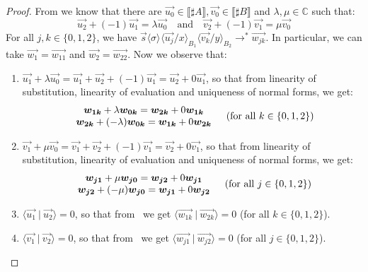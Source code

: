 \documentclass[runningheads,orivec,envcountsame,envcountsect]{llncs}
\newcommand\lra{\longrightarrow}
\newcommand\ansubst[2]{\ensuremath{\langle #1 \rangle_{#2}}}
\def\C{\mathbb{C}}            %
\def\scal#1#2{\langle{#1}~|~{#2}\rangle}
\def\eval{\lra^*}
\def\sem#1{\llbracket#1\rrbracket}
\begin{document}
\begin{proof}
    From  we know that there are $\vec{u_0}\in\sem{\sharp A}, \vec{v_0}\in\sem{\sharp B}$ and $\lambda,\mu\in\C$ such that:
    \[
    \vec{u_2} + (-1) \vec{u_1} = \lambda\vec{u_0}\quad\text{and}\quad\vec{v_2} + (-1) \vec{v_1} = \mu \vec{v_0}
    \]
    For all $j,k\in\{0,1,2\}$, we have $\vec{s}\ansubst{\sigma}{}\ansubst{\vec{u_j}/x}{B_1}\ansubst{\vec{v_k}/y}{B_2}\eval\vec{w_{jk}}$. In particular, we can take $\vec{w_1}=\vec{w_{11}}$ and $\vec{w_2}=\vec{w_{22}}$. Now we observe that:
    \begin{enumerate}
        \item\label{A8:it1} $\vec{u_1}+\lambda\vec{u_0}= \vec{u_1} + \vec{u_2} + (-1) \vec{u_1}= \vec{u_2} + 0\vec{u_1}$, so that from linearity of substitution, linearity of evaluation and uniqueness of normal forms, we get:
        \[
        \begin{array}{c c}
            \begin{array}{c}
                \vec{w_{1k}} + \lambda\vec{w_{0k}} = \vec{w_{2k}} + 0 \vec{w_{1k}}\\
                \vec{w_{2k}} + (-\lambda)\vec{w_{0k}} = \vec{w_{1k}} + 0 \vec{w_{2k}}
            \end{array}&
            (\text{for all }k\in\{0,1,2\})
        \end{array}
        \]
        
        \item\label{A8:it2} $\vec{v_1}+\mu\vec{v_0}= \vec{v_1} + \vec{v_2} + (-1) \vec{v_1}= \vec{v_2} + 0\vec{v_1}$, so that from linearity of substitution, linearity of evaluation and uniqueness of normal forms, we get:
        \[
        \begin{array}{c c}
            \begin{array}{c}
                \vec{w_{j1}} + \mu\vec{w_{j0}} = \vec{w_{j2}} + 0 \vec{w_{j1}}\\
                \vec{w_{j2}} + (-\mu)\vec{w_{j0}} = \vec{w_{j1}} + 0 \vec{w_{j2}}
            \end{array}&
            (\text{for all }j\in\{0,1,2\})
        \end{array}
        \]
        
        \item\label{A8:it3} $\scal{\vec{u_1}}{\vec{u_2}}=0$, so that from ~we get $\scal{\vec{w_{1k}}}{\vec{w_{2k}}}=0$ (for all $k\in\{0,1,2\}$).
        
        \item\label{A8:it4} $\scal{\vec{v_1}}{\vec{v_2}}=0$, so that from ~we get $\scal{\vec{w_{j1}}}{\vec{w_{j2}}}=0$ (for all $j\in\{0,1,2\}$).
    \end{enumerate}


\end{proof}
\end{document}
